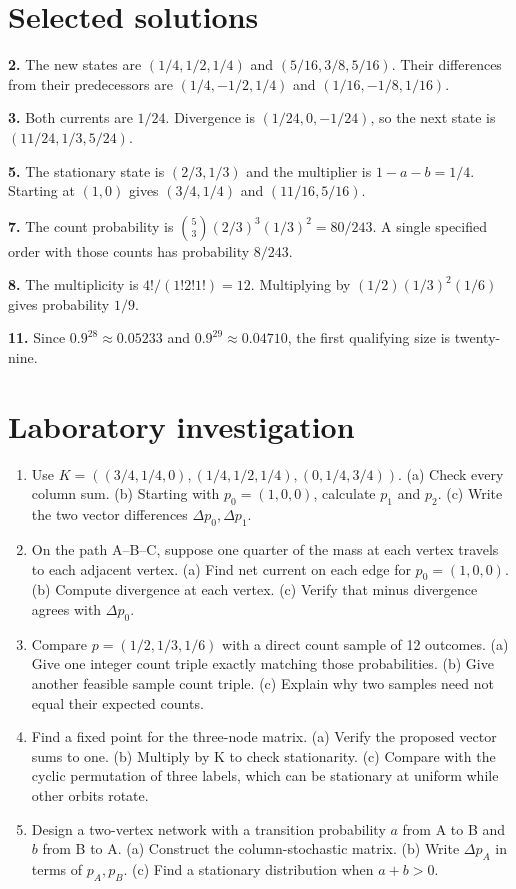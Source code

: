 \documentclass[11pt,oneside,openany]{book}
\theoremstyle{definition}
\theoremstyle{remark}
\numberwithin{equation}{chapter}
\providecommand{\tightlist}{\setlength{\itemsep}{0pt}\setlength{\parskip}{0pt}}
\newcommand{\labheading}{\FloatBarrier\section*{Laboratory investigation}\addcontentsline{toc}{section}{Laboratory investigation}}
\begin{document}
\section{Selected solutions}\label{ch04-selected-solutions}

\textbf{2.} The new states are \((1/4,1/2,1/4)\) and \((5/16,3/8,5/16)\). Their differences from their predecessors are \((1/4,-1/2,1/4)\) and \((1/16,-1/8,1/16)\).

\textbf{3.} Both currents are \(1/24\). Divergence is \((1/24,0,-1/24)\), so the next state is \((11/24,1/3,5/24)\).

\textbf{5.} The stationary state is \((2/3,1/3)\) and the multiplier is \(1-a-b=1/4\). Starting at \((1,0)\) gives \((3/4,1/4)\) and \((11/16,5/16)\).

\textbf{7.} The count probability is \(\binom53(2/3)^3(1/3)^2=80/243\). A single specified order with those counts has probability \(8/243\).

\textbf{8.} The multiplicity is \(4!/(1!2!1!)=12\). Multiplying by \((1/2)(1/3)^2(1/6)\) gives probability \(1/9\).

\textbf{11.} Since \(0.9^{28}\approx0.05233\) and \(0.9^{29}\approx0.04710\), the first qualifying size is twenty-nine.
\labheading\begin{enumerate}
\def\labelenumi{\arabic{enumi}.}
\tightlist
\item
  Use \(K=((3/4,1/4,0),(1/4,1/2,1/4),(0,1/4,3/4))\). (a) Check every column sum. (b) Starting with \(p_0=(1,0,0)\), calculate \(p_1\) and \(p_2\). (c) Write the two vector differences \(\Delta p_0,\Delta p_1\).
\item
  On the path A--B--C, suppose one quarter of the mass at each vertex travels to each adjacent vertex. (a) Find net current on each edge for \(p_0=(1,0,0)\). (b) Compute divergence at each vertex. (c) Verify that minus divergence agrees with \(\Delta p_0\).
\item
  Compare \(p=(1/2,1/3,1/6)\) with a direct count sample of 12 outcomes. (a) Give one integer count triple exactly matching those probabilities. (b) Give another feasible sample count triple. (c) Explain why two samples need not equal their expected counts.
\item
  Find a fixed point for the three-node matrix. (a) Verify the proposed vector sums to one. (b) Multiply by K to check stationarity. (c) Compare with the cyclic permutation of three labels, which can be stationary at uniform while other orbits rotate.
\item
  Design a two-vertex network with a transition probability \(a\) from A to B and \(b\) from B to A. (a) Construct the column-stochastic matrix. (b) Write \(\Delta p_A\) in terms of \(p_A,p_B\). (c) Find a stationary distribution when \(a+b>0\).
\end{enumerate}

\FloatBarrier
\end{document}
